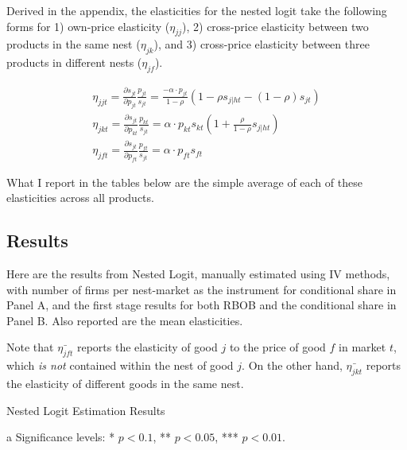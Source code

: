 \documentclass{article}
\begin{document}
Derived in the appendix, the elasticities for the nested logit take the following forms for 1) own-price elasticity ($\eta_{jj}$), 2) cross-price elasticity between two products in the same nest ($\eta_{jk}$), and 3) cross-price elasticity between three products in different nests ($\eta_{jf}$).

\begin{gather}
	\eta_{jjt} = \frac{\partial s_{jt}}{\partial p_{jt}}\frac{p_{jt}}{s_{jt}} = \frac{-\alpha \cdot p_{jt}}{1 - \rho}(1 - \rho s_{j | h t} - (1 - \rho)s_{jt}) \\
	\eta_{jkt} = \frac{\partial s_{jt}}{\partial p_{kt}}\frac{p_{kt}}{s_{jt}} = \alpha \cdot p_{kt} s_{kt} (1 + \frac{\rho}{1 - \rho} s_{j | h t}) \\  
	\eta_{jft} = \frac{\partial s_{jt}}{\partial p_{ft}}\frac{p_{ft}}{s_{jt}} = \alpha \cdot p_{ft} s_{ft}
\end{gather}

What I report in the tables below are the simple average of each of these elasticities across all products.

\subsection{Results}

Here are the results from Nested Logit, manually estimated using IV methods, with number of firms per nest-market as the instrument for conditional share in Panel A, and the first stage results for both RBOB and the conditional share in Panel B. Also reported are the mean elasticities.

Note that $\bar{\eta_{jft}}$ reports the elasticity of good $j$ to the price of good $f$ in market $t$, which \textit{is not} contained within the nest of good $j$. On the other hand, $\bar{\eta_{jkt}}$ reports the elasticity of different goods in the same nest.

\begin{table}[H]
\centering
\caption{Nested Logit Estimation Results}
\begin{threeparttable}
	
	\begin{tablenotes}
	\centering
	\item[a] Significance levels: * $p < 0.1$, ** $p < 0.05$, *** $p < 0.01$.
	\end{tablenotes}
\end{threeparttable}
\end{table}
\end{document}

